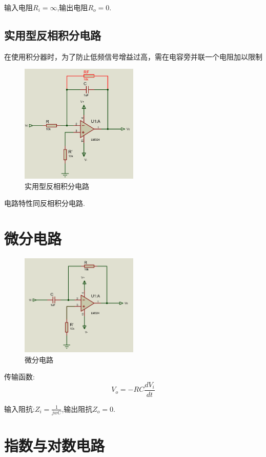 \documentclass[a4paper,11pt,UTF8]{article}
\begin{document}
输入电阻$R_i=\infty$,输出电阻$R_o=0$.

\subsection{实用型反相积分电路}
在使用积分器时，为了防止低频信号增益过高，需在电容旁并联一个电阻加以限制


\begin{figure}[H]
	\centering
	\includegraphics[width=0.5\textwidth]{实用型反相积分电路}
	\caption{实用型反相积分电路}
\end{figure}
电路特性同反相积分电路.

\section{微分电路}
\begin{figure}[H]
	\centering
	\includegraphics[width=0.5\textwidth]{微分电路}
	\caption{微分电路}
\end{figure}
传输函数:
$$V_o = -RC\frac{dV_i}{dt}$$

输入阻抗:$Z_i=\frac{1}{jwC}$,输出阻抗$Z_o=0$.
\section{指数与对数电路}
\end{document}
